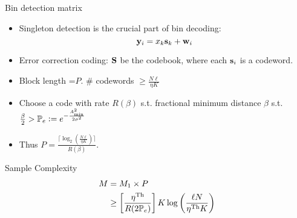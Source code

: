 \begin{frame}{Bin detection matrix}
\begin{itemize}
\item Singleton detection is the crucial part of bin decoding:
\begin{equation*}
\mathbf{y}_i=x_{k}\mathbf{s}_k +\mathbf{w}_i
\end{equation*} 
\item Error correction coding: $\mathbf{S}$ be the codebook, where each $\mathbf{s}_i$ is a codeword.
\item Block length =$P$.  $\#$ codewords $\geq \frac{N\ell}{\eta K}$
\item Choose a code with rate $R(\beta)$ s.t. fractional minimum distance $\beta$ s.t. $\frac{\beta}{2} >\mathbb{P}_{e}\mathrel{\mathop:}= e^{-\frac{A_{\text{min}}^{2}}{2\sigma^2}}$
\item Thus $P=\frac{\lceil {\log_2(\frac{N\ell}{\eta K})}\rceil}{R(\beta)}$.
\end{itemize} 

\begin{block}{Sample Complexity}
 \begin{align*}
  M&=M_1\times P \\
   &\geq \left[\frac{\eta^{\text{Th}}}{R(2\mathbb{P}_{e})}\right] K\log\left(\frac{\ell N}{\eta^{\text{Th}} K}\right)
\end{align*} 
\end{block}
\end{frame}

